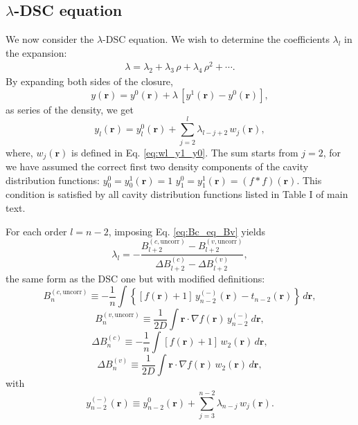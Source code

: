 \documentclass[aip,jcp,preprint,superscriptaddress,showpacs,preprintnumbers,amsmath,amssymb]{revtex4-1}
\numberwithin{equation}{section}
\newcommand{\vct}[1]{\mathbf{#1}}
\providecommand{\vr}{} %
\renewcommand{\vr}{\vct{r}}
\begin{document}
\subsection{$\lambda$-DSC equation}





We now consider the $\lambda$-DSC equation.
%
We wish to determine the coefficients $\lambda_l$
in the expansion:
%
\begin{align*}
\lambda =
\lambda_2
+
\lambda_3 \, \rho
+
\lambda_4 \, \rho^2
+ \cdots.
\end{align*}
%
By expanding both sides of the closure,
%
\begin{equation}
y(\vr) =
y^0(\vr) + \lambda \,
\left[ y^1(\vr) - y^0(\vr) \right],
\label{eq:yr_linear01}
\end{equation}
%
as series of the density, we get
%
\begin{equation*}
y_l(\vr)
=
y_l^0(\vr)
+
\sum_{j = 2}^l
\lambda_{l - j + 2} \, w_j(\vr),
\end{equation*}
%
where,
$w_j(\vr)$ is defined in Eq. \eqref{eq:wl_y1_y0}.
%
The sum starts from $j = 2$,
for we have assumed
the correct first two density components of
the cavity distribution functions:
%
$y_0^0 = y_0^1(\vr) = 1$
%
$y_1^0 = y_1^1(\vr) = (f*f)(\vr)$.
%
This condition is satisfied by
all cavity distribution functions listed
in Table I of main text.



For each order $l = n - 2$,
imposing Eq. \eqref{eq:Bc_eq_Bv} yields
%
\begin{equation}
\lambda_l =
-\frac{ B_{l+2}^{(c, \mathrm{uncorr})}
      - B_{l+2}^{(v, \mathrm{uncorr})} }
      { \Delta B_{l+2}^{(c)}
      - \Delta B_{l+2}^{(v)} },
\label{eq:lambdadsc_lambda}
\end{equation}
%
the same form as the DSC one
but with modified definitions:
%
%
%
\begin{equation}
B_n^{(c, \mathrm{uncorr})}
\equiv
-\frac{1}{n}
\int
\left\{
  \left[ f(\vr) + 1 \right] \, y_{n-2}^{(-)}(\vr)
  - t_{n-2}(\vr)
\right\}
\, d\vr,
\label{eq:lambdadsc_Bc}
\end{equation}
%
\begin{equation}
B_n^{(v, \mathrm{uncorr})}
\equiv
\frac{1}{2D}
\int
\vr \cdot \nabla f(\vr) \, y_{n-2}^{(-)} \, d\vr,
\label{eq:lambdadsc_Bv}
\end{equation}
%
\begin{equation}
\Delta B_n^{(c)}
\equiv
-\frac{1}{n}
\int
\left[ f(\vr) + 1 \right] \, w_2(\vr) \, d\vr,
\label{eq:lambdadsc_dBc}
\end{equation}
%
\begin{equation}
\Delta B_n^{(v)}
\equiv
\frac{1}{2D}
\int
\vr \cdot \nabla f(\vr) \, w_2(\vr) \, d\vr,
\label{eq:lambdadsc_dBv}
\end{equation}
%
with
%
\[
y_{n-2}^{(-)}(\vr)
\equiv
y_{n-2}^0(\vr)
+
\sum_{j=3}^{n-2}
\lambda_{n-j} \, w_j(\vr).
\]
\end{document}
